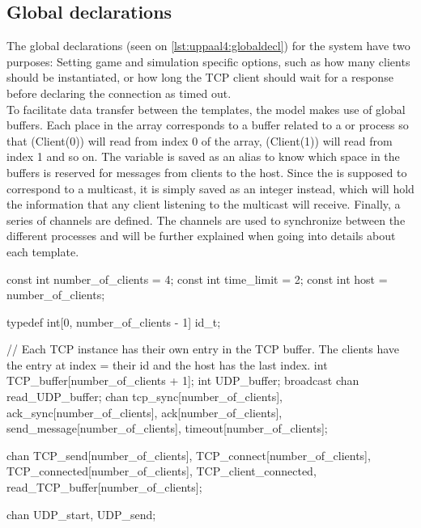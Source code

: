 \subsection{Global declarations}
The global declarations (seen on \autoref{lst:uppaal4:globaldecl}) for the system have two purposes: Setting game and simulation specific options, such as how many clients should be instantiated, or how long the TCP client should wait for a response before declaring the connection as timed out.
\\
To facilitate data transfer between the templates, the model makes use of global buffers.
Each place in the  array corresponds to a buffer related to a  or  process so that \uppProc(Client(0)) will read from index 0 of the array, \uppProc(Client(1)) will read from index 1 and so on.
The  variable is saved as an alias to know which space in the buffers is reserved for messages from clients to the host.
Since the  is supposed to correspond to a multicast, it is simply saved as an integer instead, which will hold the information that any client listening to the multicast will receive. 
Finally, a series of channels are defined.
The channels are used to synchronize between the different processes and will be further explained when going into details about each template.

\begin{uppaalcode}[caption={Global declarations}, label={lst:uppaal4:globaldecl},captionpos=b]
const int number_of_clients = 4;
const int time_limit = 2;
const int host = number_of_clients;

typedef int[0, number_of_clients - 1] id_t;

// Each TCP instance has their own entry in the TCP buffer. The clients have the entry at index = their id and the host has the last index.
int TCP_buffer[number_of_clients + 1];
int UDP_buffer;
broadcast chan read_UDP_buffer;
chan tcp_sync[number_of_clients], ack_sync[number_of_clients], ack[number_of_clients], send_message[number_of_clients], timeout[number_of_clients];

chan TCP_send[number_of_clients], TCP_connect[number_of_clients], TCP_connected[number_of_clients], TCP_client_connected, read_TCP_buffer[number_of_clients];

chan UDP_start, UDP_send;
\end{uppaalcode}

